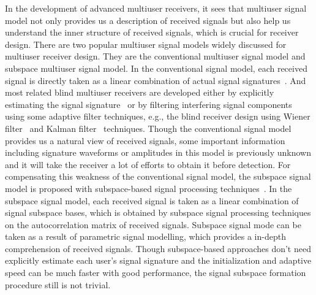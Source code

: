 \documentclass[a4paper,10pt,fleqn, twocolumn]{IEEETran}
\begin{document}
In the development of advanced multiuser receivers, it sees that
multiuser signal model not only provides us a description of
received signals but also help us understand the inner structure
of received signals, which is crucial for receiver design. There
are two popular multiuser signal models widely discussed for
multiuser receiver design. They are the conventional multiuser
signal model and subspace multiuser signal model. In the
conventional signal model, each received signal is directly taken
as a linear combination of actual signal
signatures~\cite{Verd98,Honi95,Zhang02}. And most related blind
multiuser receivers are developed either by explicitly estimating
the signal signature~\cite{Torl97} or by filtering interfering
signal components using some adaptive filter techniques, e.g., the
blind receiver design using Wiener filter~\cite{Honi95} and Kalman
filter~\cite{Zhang02} techniques. Though the conventional signal
model provides us a natural view of received signals, some
important information including signature waveforms or amplitudes
in this model is previously unknown and it will take the receiver
a lot of efforts to obtain it before detection. For compensating
this weakness of the conventional signal model, the subspace
signal model is proposed with subspace-based signal processing
techniques~\cite{Wang98}. In the subspace signal model, each
received signal is taken as a linear combination of signal
subspace bases, which is obtained by subspace signal processing
techniques on the autocorrelation matrix of received signals.
Subspace signal mode can be taken as a result of parametric signal
modelling, which provides a in-depth comprehension of received
signals. Though subspace-based approaches don't need explicitly
estimate each user's signal signature and the initialization and
adaptive speed can be much faster with good performance, the
signal subspace formation procedure still is not trivial.
\end{document}
